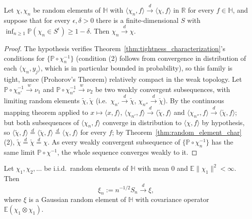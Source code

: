 \begin{theorem}
\label{thm:weak_convergence_criterion}
Let $\chi,\chi_n$ be random elements of $\mathbb{H}$ with $\langle\chi_n,f
\rangle\xrightarrow{d}\langle\chi,f\rangle$ in $\mathbb{R}$ for every
$f\in\mathbb{H}$, and suppose that for every $\epsilon,\delta>0$ there is
a finite-dimensional $S$ with $\inf_{n\geq1}\mathbb{P}(\chi_n\in
S^\epsilon)\geq1-\delta$. Then $\chi_n\xrightarrow{d}\chi$.
\end{theorem}

\begin{proof}
The hypothesis verifies Theorem~\ref{thm:tightness_characterization}'s
conditions for $\{\mathbb{P}\circ\chi_n^{-1}\}$ (condition (2) follows
from convergence in distribution of each $\langle\chi_n,y_j\rangle$,
which is in particular bounded in probability), so this family is tight,
hence (Prohorov's Theorem) relatively compact in the weak topology. Let
$\mathbb{P}\circ\chi_{n'}^{-1}\xrightarrow{w}\nu_1$ and $\mathbb{P}\circ
\chi_{n''}^{-1}\xrightarrow{w}\nu_2$ be two weakly convergent
subsequences, with limiting random elements $\widetilde\chi,\check{\chi}$
(i.e.\ $\chi_{n'}\xrightarrow{d}\widetilde\chi$, $\chi_{n''}
\xrightarrow{d}\check{\chi}$). By the continuous mapping theorem
applied to $x\mapsto\langle x,f\rangle$, $\langle\chi_{n'},f\rangle
\xrightarrow{d}\langle\widetilde\chi,f\rangle$ and $\langle\chi_{n''},f
\rangle\xrightarrow{d}\langle\check{\chi},f\rangle$; but both
subsequences of $\langle\chi_n,f\rangle$ converge in distribution to
$\langle\chi,f\rangle$ by hypothesis, so $\langle\widetilde\chi,f\rangle
\stackrel{d}{=}\langle\check{\chi},f\rangle\stackrel{d}{=}\langle\chi,f
\rangle$ for every $f$; by Theorem~\ref{thm:random_element_char}(2),
$\widetilde\chi\stackrel{d}{=}\check{\chi}\stackrel{d}{=}\chi$. As every
weakly convergent subsequence of $\{\mathbb{P}\circ\chi_n^{-1}\}$ has the
same limit $\mathbb{P}\circ\chi^{-1}$, the whole sequence converges
weakly to it.
\end{proof}

\begin{theorem}
\label{thm:hilbert_clt}
Let $\chi_1,\chi_2,\dots$ be i.i.d.\ random elements of $\mathbb{H}$ with
mean $0$ and $\mathbb{E}\|\chi_1\|^2<\infty$. Then
\begin{equation}
\xi_n := n^{-1/2}S_n \xrightarrow{d} \xi,
\label{eq:hilbert_clt}
\end{equation}
where $\xi$ is a Gaussian random element of $\mathbb{H}$ with covariance
operator $\mathbb{E}(\chi_1\otimes\chi_1)$.
\end{theorem}

